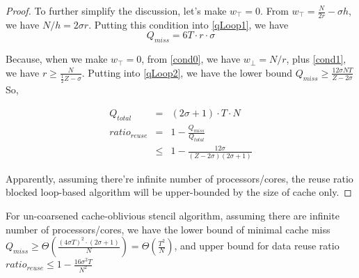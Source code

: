 \begin{proof}
To further simplify the discussion, let's make $w_{\top} = 0$.
From $w_{\top} = \frac{N}{2r} - \sigma h$, we have $N/h = 2 \sigma r$.
Putting this condition into \eqref{qLoop1}, we have 
\begin{equation}
Q_{miss} = 6 T \cdot r \cdot \sigma \label{eq:qLoop2}
\end{equation}

Because, when we make $w_{\top} = 0$, from \eqref{cond0}, we have 
$w_{\bot} = N/r$, plus \eqref{cond1},
we have $r \geq \frac{N}{\frac{1}{2} Z - \sigma}$. Putting into \eqref{qLoop2}, 
we have the lower bound $Q_{miss} \geq \frac{12 \sigma N T}{Z - 2 \sigma} $
So, 

\begin{eqnarray}
Q_{total} & = & (2 \sigma + 1) \cdot T \cdot N \\
ratio_{reuse} & = & 1 - \frac{Q_{miss}}{Q_{total}} \\
			  & \leq & 1 - \frac{12 \sigma}{(Z - 2 \sigma)(2 \sigma + 1)}
\end{eqnarray}

Apparently, assuming there're infinite number of processors/cores, the reuse ratio blocked loop-based
algorithm will be upper-bounded by the size of cache only.
\end{proof}

\begin{theorem}
For un-coarsened cache-oblivious stencil algorithm, assuming there are infinite number of processors/cores,
we have the lower bound of minimal cache miss 
$Q_{miss} \geq \Theta (\frac{(4 \sigma T)^2 \cdot (2 \sigma + 1)}{N}) = \Theta (\frac{T^2}{N})$,
and upper bound for data reuse ratio
$ratio_{reuse} \leq 1 - \frac{16 \sigma^2 T}{N^2}$
\label{thm:coUncoarsened}
\end{theorem}

